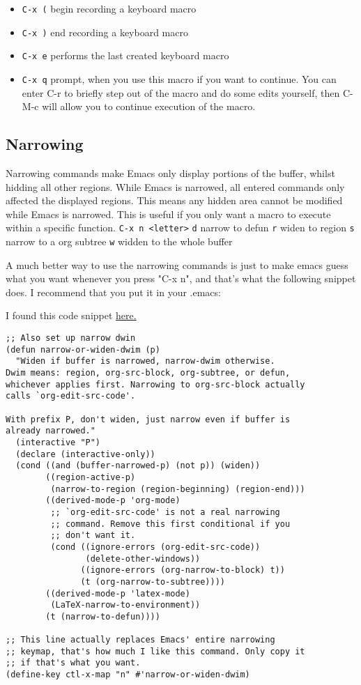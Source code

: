 \documentclass[11pt]{article}
\begin{document}
\begin{itemize}
\item \texttt{C-x (} begin recording a keyboard macro
\item \texttt{C-x )} end recording a keyboard macro
\item \texttt{C-x e}  performs the last created keyboard macro
\item \texttt{C-x q} prompt, when you use this macro if you want to continue.  You can enter C-r to briefly step out of the macro
and do some edits yourself, then C-M-c will allow you to continue execution of the macro.
\end{itemize}
\subsection{Narrowing}
\label{sec:orgheadline8}
Narrowing commands make Emacs only display portions of the buffer, whilst hidding all other regions.  While Emacs is narrowed, all entered commands only affected the displayed regions.  This means any hidden area cannot be modified while Emacs is narrowed.  This is useful if you only want a macro to execute within a specific function.
  \texttt{C-x n <letter>}
    \texttt{d} narrow to defun
    \texttt{r} widen to region
    \texttt{s} narrow to a org subtree
    \texttt{w} widden to the whole buffer

A much better way to use the narrowing commands is just to make emacs guess what you want whenever you press "C-x n", and that's what the following snippet does.  I recommend that you put it in your .emacs:

I found this code snippet \href{http://endlessparentheses.com/emacs-narrow-or-widen-dwim.html}{here.}

\begin{verbatim}
;; Also set up narrow dwin
(defun narrow-or-widen-dwim (p)
  "Widen if buffer is narrowed, narrow-dwim otherwise.
Dwim means: region, org-src-block, org-subtree, or defun,
whichever applies first. Narrowing to org-src-block actually
calls `org-edit-src-code'.

With prefix P, don't widen, just narrow even if buffer is
already narrowed."
  (interactive "P")
  (declare (interactive-only))
  (cond ((and (buffer-narrowed-p) (not p)) (widen))
        ((region-active-p)
         (narrow-to-region (region-beginning) (region-end)))
        ((derived-mode-p 'org-mode)
         ;; `org-edit-src-code' is not a real narrowing
         ;; command. Remove this first conditional if you
         ;; don't want it.
         (cond ((ignore-errors (org-edit-src-code))
                (delete-other-windows))
               ((ignore-errors (org-narrow-to-block) t))
               (t (org-narrow-to-subtree))))
        ((derived-mode-p 'latex-mode)
         (LaTeX-narrow-to-environment))
        (t (narrow-to-defun))))

;; This line actually replaces Emacs' entire narrowing
;; keymap, that's how much I like this command. Only copy it
;; if that's what you want.
(define-key ctl-x-map "n" #'narrow-or-widen-dwim)
\end{verbatim}
\end{document}
